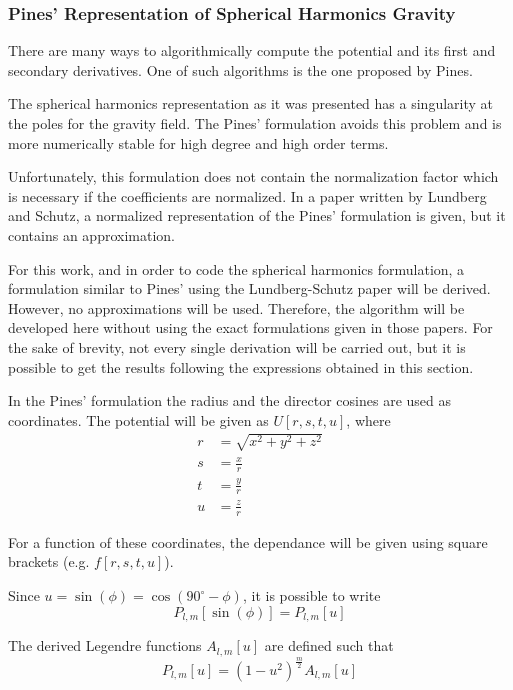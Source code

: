 \subsubsection{Pines' Representation of Spherical Harmonics Gravity}

There are many ways to algorithmically compute the potential and its first and secondary derivatives. One of such algorithms is the one proposed by Pines\cite{pines1973}.

The spherical harmonics representation as it was presented has a singularity at the poles for the gravity field. The Pines' formulation avoids this problem and is more numerically stable for high degree and high order terms.

Unfortunately, this formulation does not contain the normalization factor which is necessary if the coefficients are normalized. In a paper written by Lundberg and Schutz\cite{lundberg1988}, a normalized representation of the Pines' formulation is given, but it contains an approximation.

For this work, and in order to code the spherical harmonics formulation, a formulation similar to Pines' using the Lundberg-Schutz paper will be derived. However, no approximations will be used. Therefore, the algorithm will be developed here without using the exact formulations given in those papers. For the sake of brevity, not every single derivation will be carried out, but it is possible to get the results following the expressions obtained in this section.

In the Pines' formulation the radius and the director cosines are used as coordinates. The potential will be given as $U[r, s, t, u]$, where
\begin{align}
	r &= \sqrt{x^2+y^2+z^2}\\
	s &= \frac{x}{r}\\
	t &= \frac{y}{r}\\
	u &= \frac{z}{r}
\end{align}

For a function of these coordinates, the dependance will be given using square brackets (e.g. $f[r,s,t,u]$).

Since $u = \sin(\phi) = \cos(90^\circ - \phi)$, it is possible to write
\begin{equation}
P_{l,m}[\sin(\phi)] = P_{l,m}[u]
\end{equation}

The derived Legendre functions $A_{l,m}[u]$ are defined such that
\begin{equation}
P_{l,m}[u] = (1 - u^2)^\frac{m}{2} A_{l,m}[u]
\end{equation}


